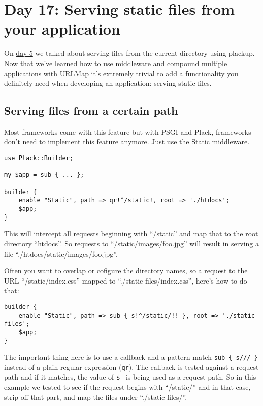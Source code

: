 \chapter{Day 17: Serving static files from your
application}\label{day-17-serving-static-files-from-your-application}

On
\href{http://advent.plackperl.org/2009/12/day-5-run-a-static-file-web-server-with-plack.html}{day
5} we talked about serving files from the current directory using
plackup. Now that we've learned how to
\href{http://advent.plackperl.org/2009/12/day-10-using-plack-middleware.html}{use
middleware} and
\href{http://advent.plackperl.org/2009/12/day-12-maps-multiple-apps-with-mount-and-urlmap.html}{compound
multiple applications with URLMap} it's extremely trivial to add a
functionality you definitely need when developing an application:
serving static files.

\section{Serving files from a certain
path}\label{serving-files-from-a-certain-path}

Most frameworks come with this feature but with PSGI and Plack,
frameworks don't need to implement this feature anymore. Just use the
Static middleware.

\begin{lstlisting}
use Plack::Builder;

my $app = sub { ... };

builder {
    enable "Static", path => qr!^/static!, root => './htdocs';
    $app;
}
\end{lstlisting}

This will intercept all requests beginning with ``/static'' and map that
to the root directory ``htdocs''. So requests to
``/static/images/foo.jpg'' will result in serving a file
``./htdocs/static/images/foo.jpg''.

Often you want to overlap or cofigure the directory names, so a request
to the URL ``/static/index.css'' mapped to ``./static-files/index.css'',
here's how to do that:

\begin{lstlisting}
builder {
    enable "Static", path => sub { s!^/static/!! }, root => './static-files';
    $app;
}
\end{lstlisting}

The important thing here is to use a callback and a pattern match
\lstinline!sub { s/// }! instead of a plain regular expression
(\lstinline!qr!). The callback is tested against a request path and if
it matches, the value of \lstinline!$_! is being used as a request path.
So in this example we tested to see if the request begins with
``/static/'' and in that case, strip off that part, and map the files
under ``./static-files/''.

